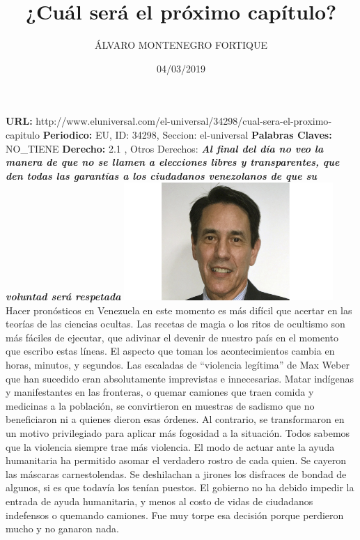 \documentclass{article}%
\title{\textbf{¿Cuál será el próximo capítulo?}}%
\author{ÁLVARO MONTENEGRO FORTIQUE}%
\date{04/03/2019}%
\begin{document}
%
\normalsize%
\maketitle%
\textbf{URL: }%
http://www.eluniversal.com/el{-}universal/34298/cual{-}sera{-}el{-}proximo{-}capitulo\newline%
%
\textbf{Periodico: }%
EU, %
ID: %
34298, %
Seccion: %
el{-}universal\newline%
%
\textbf{Palabras Claves: }%
NO\_TIENE\newline%
%
\textbf{Derecho: }%
2.1%
, Otros Derechos: %
\newline%
%
\textbf{\textit{Al final del día no veo la manera de que no se llamen a elecciones libres y transparentes, que den todas las garantías a los ciudadanos venezolanos de que su voluntad será respetada}}%
\newline%
\newline%
%
\includegraphics[width=300px]{EU_34298.jpg}%
\newline%
%
Hacer pronósticos en Venezuela en este momento es más difícil que acertar en las  teorías de las ciencias ocultas. Las recetas de magia o los ritos de ocultismo son más fáciles de ejecutar, que adivinar el devenir de nuestro país en el momento que escribo estas líneas. El aspecto que toman los acontecimientos cambia en horas, minutos, y segundos. Las escaladas de “violencia legítima” de Max Weber que han sucedido eran absolutamente imprevistas e innecesarias. Matar indígenas y manifestantes en las fronteras, o quemar camiones que traen comida y medicinas a la población, se convirtieron en muestras de sadismo que no beneficiaron ni a quienes dieron esas órdenes. Al contrario, se transformaron en un motivo privilegiado para aplicar más fogosidad a la situación. Todos sabemos que la violencia siempre trae más violencia. El modo de actuar ante la ayuda humanitaria ha permitido asomar el verdadero rostro de cada quien. Se cayeron las máscaras carnestolendas. Se deshilachan a jirones los disfraces de bondad de algunos, si es que todavía los tenían puestos. El gobierno no ha debido impedir la entrada de ayuda humanitaria, y menos al costo de vidas de ciudadanos indefensos o quemando camiones. Fue muy torpe esa decisión porque perdieron mucho y no ganaron nada.%
\end{document}
